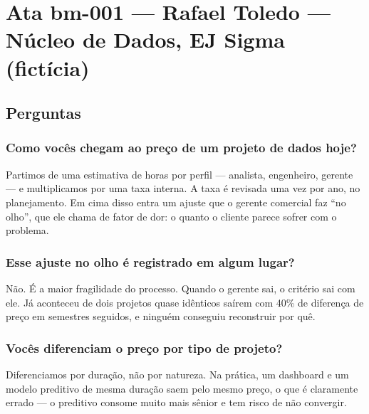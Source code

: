 
\clearpage
\section{Ata bm-001 — Rafael Toledo — Núcleo de Dados, EJ Sigma (fictícia)}



\subsection{Perguntas}

\subsubsection{Como vocês chegam ao preço de um projeto de dados hoje?}

Partimos de uma estimativa de horas por perfil — analista, engenheiro, gerente — e multiplicamos por uma taxa interna. A taxa é revisada uma vez por ano, no planejamento. Em cima disso entra um ajuste que o gerente comercial faz “no olho”, que ele chama de fator de dor: o quanto o cliente parece sofrer com o problema.

\subsubsection{Esse ajuste no olho é registrado em algum lugar?}

Não. É a maior fragilidade do processo. Quando o gerente sai, o critério sai com ele. Já aconteceu de dois projetos quase idênticos saírem com 40\% de diferença de preço em semestres seguidos, e ninguém conseguiu reconstruir por quê.

\subsubsection{Vocês diferenciam o preço por tipo de projeto?}

Diferenciamos por duração, não por natureza. Na prática, um dashboard e um modelo preditivo de mesma duração saem pelo mesmo preço, o que é claramente errado — o preditivo consome muito mais sênior e tem risco de não convergir.

